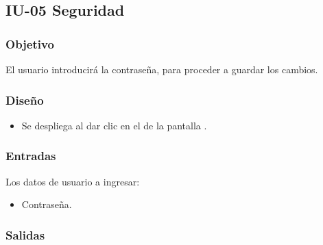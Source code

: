 \newpage
\subsection{IU-05 Seguridad}

\subsubsection{Objetivo}
	El usuario introducirá la contraseña, para proceder a guardar los cambios.

\subsubsection{Diseño}
	\begin{itemize}
		\item Se despliega al dar clic en el  de la pantalla .
\end{itemize}		


\subsubsection{Entradas}
Los datos de usuario a ingresar:
\begin{itemize}
	\item Contraseña.
\end{itemize}

\subsubsection{Salidas}
\begin{Citemize}
	\item {}
	\item {}
	\item {}
\end{Citemize}
